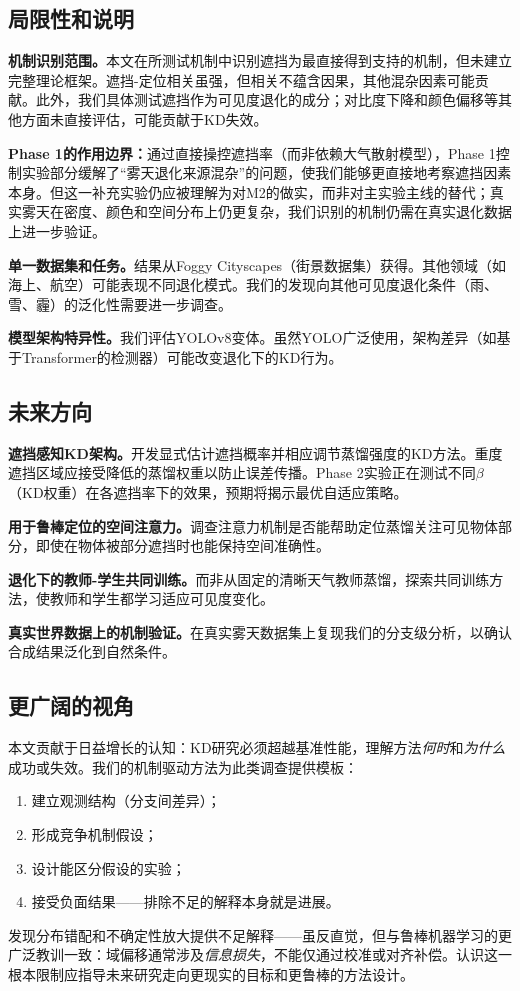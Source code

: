 \subsection{局限性和说明}

\textbf{机制识别范围。}本文在所测试机制中识别遮挡为最直接得到支持的机制，但未建立完整理论框架。遮挡-定位相关虽强，但相关不蕴含因果，其他混杂因素可能贡献。此外，我们具体测试遮挡作为可见度退化的成分；对比度下降和颜色偏移等其他方面未直接评估，可能贡献于KD失效。

\textbf{Phase 1的作用边界：}通过直接操控遮挡率（而非依赖大气散射模型），Phase 1控制实验部分缓解了“雾天退化来源混杂”的问题，使我们能够更直接地考察遮挡因素本身。但这一补充实验仍应被理解为对M2的做实，而非对主实验主线的替代；真实雾天在密度、颜色和空间分布上仍更复杂，我们识别的机制仍需在真实退化数据上进一步验证。

\textbf{单一数据集和任务。}结果从Foggy Cityscapes（街景数据集）获得。其他领域（如海上、航空）可能表现不同退化模式。我们的发现向其他可见度退化条件（雨、雪、霾）的泛化性需要进一步调查。

\textbf{模型架构特异性。}我们评估YOLOv8变体。虽然YOLO广泛使用，架构差异（如基于Transformer的检测器）可能改变退化下的KD行为。

\subsection{未来方向}

\textbf{遮挡感知KD架构。}开发显式估计遮挡概率并相应调节蒸馏强度的KD方法。重度遮挡区域应接受降低的蒸馏权重以防止误差传播。Phase 2实验正在测试不同$\beta$（KD权重）在各遮挡率下的效果，预期将揭示最优自适应策略。

\textbf{用于鲁棒定位的空间注意力。}调查注意力机制是否能帮助定位蒸馏关注可见物体部分，即使在物体被部分遮挡时也能保持空间准确性。

\textbf{退化下的教师-学生共同训练。}而非从固定的清晰天气教师蒸馏，探索共同训练方法，使教师和学生都学习适应可见度变化。

\textbf{真实世界数据上的机制验证。}在真实雾天数据集上复现我们的分支级分析，以确认合成结果泛化到自然条件。

\subsection{更广阔的视角}

本文贡献于日益增长的认知：KD研究必须超越基准性能，理解方法\emph{何时}和\emph{为什么}成功或失效。我们的机制驱动方法为此类调查提供模板：
\begin{enumerate}
    \item 建立观测结构（分支间差异）；
    \item 形成竞争机制假设；
    \item 设计能区分假设的实验；
    \item 接受负面结果——排除不足的解释本身就是进展。
\end{enumerate}

发现分布错配和不确定性放大提供不足解释——虽反直觉，但与鲁棒机器学习的更广泛教训一致：域偏移通常涉及\emph{信息损失}，不能仅通过校准或对齐补偿。认识这一根本限制应指导未来研究走向更现实的目标和更鲁棒的方法设计。
